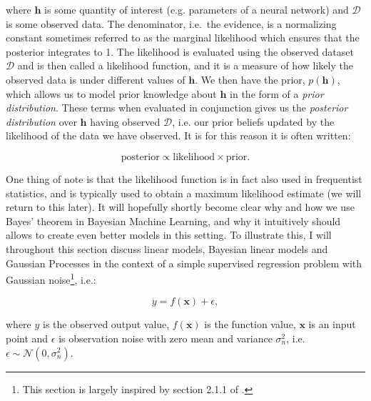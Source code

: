\noindent where $\mathbf{h}$ is some quantity of interest (e.g. parameters of a neural network) and $\mathcal{D}$ is some observed data. The denominator, i.e.\ the evidence, is a normalizing constant sometimes referred to as the marginal likelihood which ensures that the posterior integrates to 1. The likelihood is evaluated using the observed dataset $\mathcal{D}$ and is then called a likelihood function, and it is a measure of how likely the observed data is under different values of $\mathbf{h}$. We then have the prior, $p(\mathbf{h})$, which allows us to model prior knowledge about $\mathbf{h}$ in the form of a \textit{prior distribution}. These terms when evaluated in conjunction gives us the \textit{posterior distribution} over $\mathbf{h}$ having observed $\mathcal{D}$, i.e. our prior beliefs updated by the likelihood of the data we have observed. It is for this reason it is often written:

\begin{equation}
    \text{posterior} \propto \text{likelihood} \times \text{prior}.
\end{equation}

\noindent One thing of note is that the likelihood function is in fact also used in frequentist statistics, and is typically used to obtain a maximum likelihood estimate (we will return to this later). It will hopefully shortly become clear why and how we use Bayes' theorem in Bayesian Machine Learning, and why it intuitively should allows to create even better models in this setting. To illustrate this, I will throughout this section discuss linear models, Bayesian linear models and Gaussian Processes in the context of a simple supervised regression problem with Gaussian noise\footnote{This section is largely inspired by section 2.1.1 of \cite{Rasmussen2006Gaussian}.}, i.e.:

\begin{equation}
    y = f(\mathbf{x}) + \epsilon,
\label{eq:problem_setup}
\end{equation}

\noindent where $y$ is the observed output value, $f(\mathbf{x})$ is the function value, $\mathbf{x}$ is an input point and $\epsilon$ is observation noise with zero mean and variance $\sigma_{n}^2$, i.e. $\epsilon \sim \mathcal{N}(0, \sigma_{n}^2)$. \\


